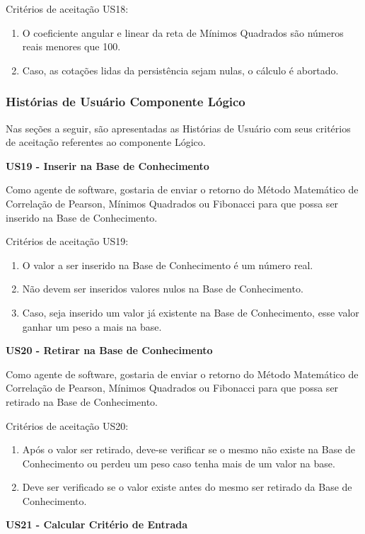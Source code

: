 Critérios de aceitação US18:
\begin{enumerate}
\item O coeficiente angular e linear da reta de Mínimos Quadrados são números reais menores que 100.
\item Caso, as cotações lidas da persistência sejam nulas, o cálculo é abortado.
\end{enumerate}

\subsubsection{Histórias de Usuário Componente Lógico}

Nas seções a seguir, são apresentadas as Histórias de Usuário com seus critérios de aceitação referentes ao componente Lógico.	

\textbf{US19 - Inserir na Base de Conhecimento}

Como agente de software, gostaria de enviar o retorno do Método Matemático de Correlação de Pearson, Mínimos Quadrados ou Fibonacci para que possa ser inserido na Base de Conhecimento.

Critérios de aceitação US19:
\begin{enumerate}
\item O valor a ser inserido na Base de Conhecimento é um número real.
\item Não devem ser inseridos valores nulos na Base de Conhecimento.
\item Caso, seja inserido um valor já existente na Base de Conhecimento, esse valor ganhar um peso a mais na base.
\end{enumerate}

\textbf{US20 - Retirar na Base de Conhecimento}

Como agente de software, gostaria de enviar o retorno do Método Matemático de Correlação de Pearson, Mínimos Quadrados ou Fibonacci para que possa ser retirado na Base de Conhecimento.

Critérios de aceitação US20:
\begin{enumerate}
\item Após o valor ser retirado, deve-se verificar se o mesmo não existe na Base de Conhecimento ou perdeu um peso caso tenha mais de um valor na base.
\item Deve ser verificado se o valor existe antes do mesmo ser retirado da Base de Conhecimento.
\end{enumerate}

\textbf{US21 - Calcular Critério de Entrada}

